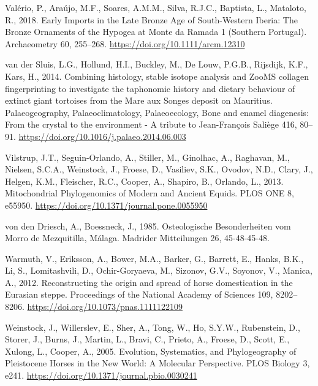 \documentclass[preprint, 3p, authoryear]{elsarticle} %
\newlength{\cslhangindent}
\newlength{\cslentryspacingunit} %
\newenvironment{CSLReferences}[2] %
 {%
  \setlength{\parindent}{0pt}
  \ifodd #1
  \let\oldpar\par
  \def\par{\hangindent=\cslhangindent\oldpar}
  \fi
  \setlength{\parskip}{#2\cslentryspacingunit}
 }%
 {}
\begin{document}
\begin{CSLReferences}{1}{0}
\leavevmode{}%
Valério, P., Araújo, M.F., Soares, A.M.M., Silva, R.J.C., Baptista, L., Mataloto, R., 2018. Early {Imports} in the {Late Bronze Age} of {South-Western Iberia}: {The Bronze Ornaments} of the {Hypogea} at {Monte} da {Ramada} 1 ({Southern Portugal}). Archaeometry 60, 255--268. \url{https://doi.org/10.1111/arcm.12310}

\leavevmode{}%
van der Sluis, L.G., Hollund, H.I., Buckley, M., De Louw, P.G.B., Rijsdijk, K.F., Kars, H., 2014. Combining histology, stable isotope analysis and {ZooMS} collagen fingerprinting to investigate the taphonomic history and dietary behaviour of extinct giant tortoises from the {Mare} aux {Songes} deposit on {Mauritius}. Palaeogeography, Palaeoclimatology, Palaeoecology, Bone and enamel diagenesis: {From} the crystal to the environment - {A} tribute to {Jean-François Saliège} 416, 80--91. \url{https://doi.org/10.1016/j.palaeo.2014.06.003}

\leavevmode{}%
Vilstrup, J.T., Seguin-Orlando, A., Stiller, M., Ginolhac, A., Raghavan, M., Nielsen, S.C.A., Weinstock, J., Froese, D., Vasiliev, S.K., Ovodov, N.D., Clary, J., Helgen, K.M., Fleischer, R.C., Cooper, A., Shapiro, B., Orlando, L., 2013. Mitochondrial {Phylogenomics} of {Modern} and {Ancient Equids}. PLOS ONE 8, e55950. \url{https://doi.org/10.1371/journal.pone.0055950}

\leavevmode{}%
von den Driesch, A., Boessneck, J., 1985. Osteologische {Besonderheiten} vom {Morro} de {Mezquitilla}, {Málaga}. Madrider Mitteilungen 26, 45-48-45-48.

\leavevmode{}%
Warmuth, V., Eriksson, A., Bower, M.A., Barker, G., Barrett, E., Hanks, B.K., Li, S., Lomitashvili, D., Ochir-Goryaeva, M., Sizonov, G.V., Soyonov, V., Manica, A., 2012. Reconstructing the origin and spread of horse domestication in the {Eurasian} steppe. Proceedings of the National Academy of Sciences 109, 8202--8206. \url{https://doi.org/10.1073/pnas.1111122109}

\leavevmode{}%
Weinstock, J., Willerslev, E., Sher, A., Tong, W., Ho, S.Y.W., Rubenstein, D., Storer, J., Burns, J., Martin, L., Bravi, C., Prieto, A., Froese, D., Scott, E., Xulong, L., Cooper, A., 2005. Evolution, {Systematics}, and {Phylogeography} of {Pleistocene Horses} in the {New World}: {A Molecular Perspective}. PLOS Biology 3, e241. \url{https://doi.org/10.1371/journal.pbio.0030241}


\end{CSLReferences}
\end{document}
